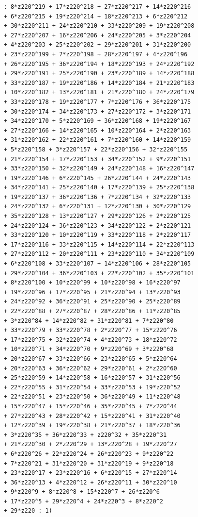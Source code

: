 \documentclass{scrartcl}
\theoremstyle{definition}
\begin{document}
\begin{lstlisting}
    : 8*z220^219 + 17*z220^218 + 27*z220^217 + 14*z220^216 
    + 6*z220^215 + 19*z220^214 + 18*z220^213 + 6*z220^212 
    + 30*z220^211 + 24*z220^210 + 33*z220^209 + 19*z220^208 
    + 27*z220^207 + 16*z220^206 + 24*z220^205 + 3*z220^204 
    + 4*z220^203 + 25*z220^202 + 29*z220^201 + 31*z220^200 
    + 23*z220^199 + 7*z220^198 + 28*z220^197 + 4*z220^196 
    + 26*z220^195 + 36*z220^194 + 18*z220^193 + 24*z220^192 
    + 29*z220^191 + 25*z220^190 + 23*z220^189 + 14*z220^188 
    + 33*z220^187 + 19*z220^186 + 14*z220^184 + 21*z220^183 
    + 10*z220^182 + 13*z220^181 + 21*z220^180 + 24*z220^179 
    + 33*z220^178 + 19*z220^177 + 7*z220^176 + 36*z220^175 
    + 30*z220^174 + 34*z220^173 + 27*z220^172 + 3*z220^171 
    + 34*z220^170 + 5*z220^169 + 36*z220^168 + 19*z220^167 
    + 27*z220^166 + 14*z220^165 + 10*z220^164 + 2*z220^163 
    + 31*z220^162 + 22*z220^161 + 7*z220^160 + 14*z220^159 
    + 5*z220^158 + 3*z220^157 + 22*z220^156 + 32*z220^155 
    + 21*z220^154 + 17*z220^153 + 34*z220^152 + 9*z220^151 
    + 33*z220^150 + 32*z220^149 + 24*z220^148 + 16*z220^147 
    + 19*z220^146 + 6*z220^145 + 26*z220^144 + 24*z220^143 
    + 34*z220^141 + 25*z220^140 + 17*z220^139 + 25*z220^138 
    + 19*z220^137 + 36*z220^136 + 7*z220^134 + 32*z220^133 
    + 24*z220^132 + 6*z220^131 + 12*z220^130 + 30*z220^129 
    + 35*z220^128 + 13*z220^127 + 29*z220^126 + 2*z220^125 
    + 24*z220^124 + 36*z220^123 + 34*z220^122 + 2*z220^121 
    + 33*z220^120 + 10*z220^119 + 33*z220^118 + 2*z220^117 
    + 17*z220^116 + 33*z220^115 + 14*z220^114 + 22*z220^113
    + 27*z220^112 + 20*z220^111 + 23*z220^110 + 34*z220^109 
    + 6*z220^108 + 33*z220^107 + 14*z220^106 + 28*z220^105 
    + 29*z220^104 + 36*z220^103 + 22*z220^102 + 35*z220^101 
    + 8*z220^100 + 10*z220^99 + 10*z220^98 + 16*z220^97 
    + 19*z220^96 + 17*z220^95 + 21*z220^94 + 13*z220^93 
    + 24*z220^92 + 36*z220^91 + 25*z220^90 + 25*z220^89 
    + 22*z220^88 + 27*z220^87 + 28*z220^86 + 11*z220^85 
    + 3*z220^84 + 14*z220^82 + 31*z220^81 + 7*z220^80 
    + 33*z220^79 + 33*z220^78 + 2*z220^77 + 15*z220^76 
    + 17*z220^75 + 32*z220^74 + 4*z220^73 + 18*z220^72 
    + 10*z220^71 + 34*z220^70 + 9*z220^69 + 3*z220^68 
    + 20*z220^67 + 33*z220^66 + 23*z220^65 + 5*z220^64 
    + 20*z220^63 + 36*z220^62 + 29*z220^61 + 2*z220^60 
    + 25*z220^59 + 14*z220^58 + 16*z220^57 + 31*z220^56 
    + 22*z220^55 + 31*z220^54 + 33*z220^53 + 19*z220^52 
    + 22*z220^51 + 23*z220^50 + 36*z220^49 + 11*z220^48 
    + 15*z220^47 + 15*z220^46 + 35*z220^45 + 7*z220^44 
    + 27*z220^43 + 28*z220^42 + 15*z220^41 + 31*z220^40 
    + 12*z220^39 + 19*z220^38 + 21*z220^37 + 18*z220^36 
    + 3*z220^35 + 36*z220^33 + z220^32 + 35*z220^31 
    + 21*z220^30 + 2*z220^29 + 13*z220^28 + 19*z220^27 
    + 6*z220^26 + 22*z220^24 + 26*z220^23 + 9*z220^22 
    + 7*z220^21 + 31*z220^20 + 31*z220^19 + 9*z220^18 
    + 23*z220^17 + 23*z220^16 + 6*z220^15 + 27*z220^14 
    + 36*z220^13 + 4*z220^12 + 26*z220^11 + 30*z220^10 
    + 9*z220^9 + 8*z220^8 + 15*z220^7 + 26*z220^6 
    + 17*z220^5 + 29*z220^4 + 24*z220^3 + 8*z220^2 
    + 29*z220 : 1)
\end{lstlisting}
\end{document}
